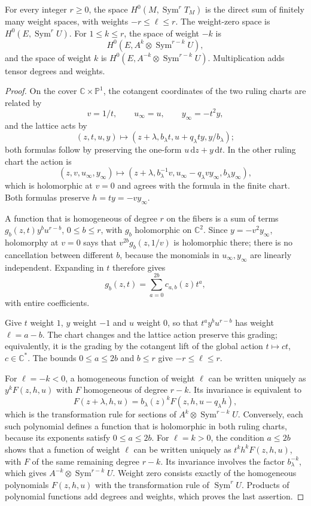 \begin{lemma}\label{lem:split-elliptic-tensor-weights}
For every integer $r\geq0$, the space $H^0(M,\operatorname{Sym}^rT_M)$ is the direct sum of finitely many weight spaces, with weights $-r\leq\ell\leq r$. The weight-zero space is $H^0(E,\operatorname{Sym}^rU)$. For $1\leq k\leq r$, the space of weight $-k$ is
\[
 H^0(E,A^k\otimes\operatorname{Sym}^{r-k}U),
\]
and the space of weight $k$ is $H^0(E,A^{-k}\otimes\operatorname{Sym}^{r-k}U)$. Multiplication adds tensor degrees and weights.
\end{lemma}
\begin{proof}
On the cover $\mathbb C\times\mathbb P^1$, the cotangent coordinates of the two ruling charts are related by
\[
 v=1/t,\qquad u_\infty=u,\qquad y_\infty=-t^2y,
\]
and the lattice acts by
\[
 (z,t,u,y)\longmapsto
 (z+\lambda,b_\lambda t,u+q_\lambda ty,y/b_\lambda);
\]
both formulas follow by preserving the one-form $u\,\mathrm{d}z+y\,\mathrm{d}t$. In the other ruling chart the action is
\[
 (z,v,u_\infty,y_\infty)\longmapsto
 (z+\lambda,b_\lambda^{-1}v,
 u_\infty-q_\lambda v y_\infty,b_\lambda y_\infty),
\]
which is holomorphic at $v=0$ and agrees with the formula in the finite chart. Both formulas preserve $h=ty=-v y_\infty$.

A function that is homogeneous of degree $r$ on the fibers is a sum of terms $g_b(z,t)y^bu^{r-b}$, $0\leq b\leq r$, with $g_b$ holomorphic on $\mathbb C^2$. Since $y=-v^2y_\infty$, holomorphy at $v=0$ says that $v^{2b}g_b(z,1/v)$ is holomorphic there; there is no cancellation between different $b$, because the monomials in $u_\infty,y_\infty$ are linearly independent. Expanding in $t$ therefore gives
\[
 g_b(z,t)=\sum_{a=0}^{2b}c_{a,b}(z)t^a,
\]
with entire coefficients.

Give $t$ weight $1$, $y$ weight $-1$ and $u$ weight $0$, so that $t^ay^bu^{r-b}$ has weight $\ell=a-b$. The chart changes and the lattice action preserve this grading; equivalently, it is the grading by the cotangent lift of the global action $t\mapsto ct$, $c\in\mathbb C^*$. The bounds $0\leq a\leq2b$ and $b\leq r$ give $-r\leq\ell\leq r$.

For $\ell=-k<0$, a homogeneous function of weight $\ell$ can be written uniquely as $y^kF(z,h,u)$ with $F$ homogeneous of degree $r-k$. Its invariance is equivalent to
\[
 F(z+\lambda,h,u)
       =b_\lambda(z)^kF(z,h,u-q_\lambda h),
\]
which is the transformation rule for sections of $A^k\otimes\operatorname{Sym}^{r-k}U$. Conversely, each such polynomial defines a function that is holomorphic in both ruling charts, because its exponents satisfy $0\leq a\leq2b$. For $\ell=k>0$, the condition $a\leq2b$ shows that a function of weight $\ell$ can be written uniquely as $t^kh^kF(z,h,u)$, with $F$ of the same remaining degree $r-k$. Its invariance involves the factor $b_\lambda^{-k}$, which gives $A^{-k}\otimes\operatorname{Sym}^{r-k}U$. Weight zero consists exactly of the homogeneous polynomials $F(z,h,u)$ with the transformation rule of $\operatorname{Sym}^rU$. Products of polynomial functions add degrees and weights, which proves the last assertion.
\end{proof}

